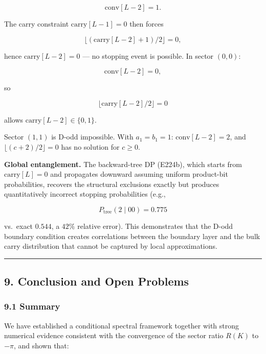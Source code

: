 \documentclass[
  11pt,
]{article}
\begin{document}
\[\mathrm{conv}[L-2] = 1.\]

The carry constraint \(\mathrm{carry}[L-1] = 0\) then forces

\[\lfloor(\mathrm{carry}[L-2] + 1)/2\rfloor = 0,\]

hence \(\mathrm{carry}[L-2] = 0\) --- no stopping event is possible. In sector
\((0,0)\):

\[\mathrm{conv}[L-2] = 0,\]

so

\[\lfloor\mathrm{carry}[L-2]/2\rfloor = 0\]

allows \(\mathrm{carry}[L-2] \in \lbrace{}0, 1\rbrace{}\).

Sector \((1,1)\) is D-odd impossible. With \(a_1 = b_1 = 1\):
\(\mathrm{conv}[L-2] = 2\), and \(\lfloor(c + 2)/2\rfloor = 0\) has no solution
for \(c \geq 0\).

\textbf{Global entanglement.} The backward-tree DP (E224b), which starts from
\(\mathrm{carry}[L] = 0\) and propagates downward assuming uniform product-bit
probabilities, recovers the structural exclusions exactly but produces
quantitatively incorrect stopping probabilities (e.g.,

\[P_{\mathrm{tree}}(2 \mid 00) = 0.775\]

vs.~exact \(0.544\), a \(42\%\) relative error). This demonstrates that the
D-odd boundary condition creates correlations between the boundary layer and the
bulk carry distribution that cannot be captured by local approximations.

\begin{center}\rule{0.5\linewidth}{0.5pt}\end{center}

\newpage

\subsection{9. Conclusion and Open Problems}\label{conclusion-and-open-problems}

\subsubsection{9.1 Summary}\label{summary}

We have established a conditional spectral framework together with strong
numerical evidence consistent with the convergence of the sector ratio \(R(K)\)
to \(-\pi\), and shown that:
\end{document}
